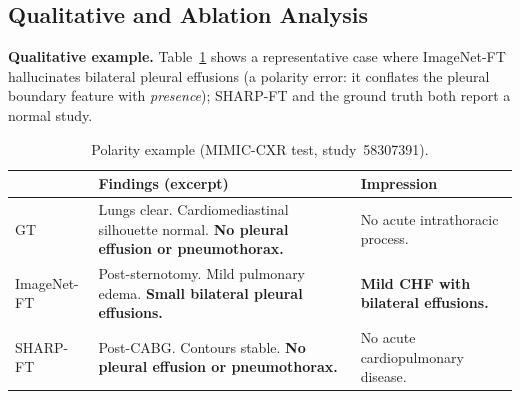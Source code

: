 \documentclass[runningheads]{llncs}
\begin{document}
\begin{table}[t]
\centering
\caption{\textbf{Section-level NLG metrics} (MIMIC-CXR test, 1,624 studies).
         Impression gains significant ($p{<}0.001$); Findings n.s.}
\label{tab:sections}
\end{table}

\subsection{Qualitative and Ablation Analysis}
\label{ssec:analysis}

\noindent\textbf{Qualitative example.}
Table~\ref{tab:qual} shows a representative case where ImageNet-FT
hallucinates bilateral pleural effusions (a polarity error: it
conflates the pleural boundary feature with \textit{presence});
SHARP-FT and the ground truth both report a normal study.

\begin{table}[t]
\centering
\caption{Polarity example (MIMIC-CXR test, study~58307391).}
\label{tab:qual}
{\scriptsize\setlength{\tabcolsep}{3pt}%
\begin{tabular}{lp{4.9cm}p{2.3cm}}
\toprule
& \textbf{Findings (excerpt)} & \textbf{Impression} \\
\midrule
GT &
  Lungs clear. Cardiomediastinal silhouette normal.
  \textbf{No pleural effusion or pneumothorax.} &
  No acute intrathoracic process. \\[1pt]
ImageNet-FT &
  Post-sternotomy. Mild pulmonary edema.
  \textbf{Small bilateral pleural effusions.} &
  \textbf{Mild CHF with bilateral effusions.} \\[1pt]
SHARP-FT &
  Post-CABG. Contours stable.
  \textbf{No pleural effusion or pneumothorax.} &
  No acute cardiopulmonary disease. \\
\bottomrule
\end{tabular}}
\end{table}
\end{document}
